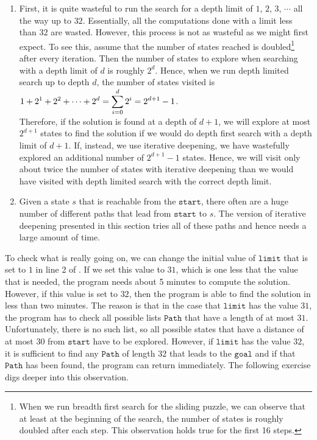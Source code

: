 \begin{enumerate}
\item First, it is quite wasteful to run the search for a depth limit of $1$, $2$, $3$, $\cdots$ all the way up
      to $32$.  Essentially, all the computations done with a limit less than $32$ are wasted. However,
      this process is not as wasteful as we might first expect.  To see this, assume that the number of states
      reached is doubled\footnote{
        When we run breadth first search for the sliding puzzle, we can observe that at least at the beginning
        of the search, the number of states is roughly doubled after each step.  This observation holds true for
        the first 16 steps. 
      }
      after every iteration.  Then the number of states to explore when searching with a depth limit of $d$ is 
      roughly $2^d$.  Hence, when we run depth limited search up to depth $d$, the number of states visited is 
      \\[0.2cm]
      \hspace*{1.3cm}
      $\displaystyle 1 + 2^1 + 2^2 + \cdots + 2^d = \sum\limits_{i=0}^d 2^i = 2^{d+1} - 1$.
      \\[0.2cm]
      Therefore, if the solution is found at a depth of $d+1$, we will explore at most $2^{d+1}$ states to find
      the solution if we would do depth first search with a depth limit of $d+1$.  If, instead, we use
      iterative deepening, we have wastefully explored an additional number of $2^{d+1} -1$ states.  Hence, we
      will visit only about twice the number of states with iterative deepening than we would have visited with depth
      limited search with the correct depth limit.
\item Given a state $s$ that is reachable from the $\texttt{start}$, there often are a huge number of
      different paths that lead from $\texttt{start}$ to $s$.  The version of iterative deepening presented in
      this section tries all of these paths and hence needs a large amount of time.
\end{enumerate}
To check what is really going on, we can change the initial value of $\texttt{limit}$ that is set to $1$ in
line 2 of .  If we set this value to $31$, which is one less that the
value that is needed, the program needs about 5 minutes to compute the solution.  However, if this value is set to
$32$, then the program is able to find the solution in less than two minutes.  The reason is that in the case that 
$\texttt{limit}$ has the value $31$, the program has to check all possible lists $\texttt{Path}$ that have a
length of at most $31$.  Unfortunately, there is no such list, so all possible states that have a distance of
at most $30$ from $\texttt{start}$ have to be explored. However, if $\texttt{limit}$ has the value $32$, it is sufficient to find any
$\texttt{Path}$ of length $32$ that leads to the $\texttt{goal}$ and if that $\texttt{Path}$ has been found, the
program can return immediately.  The following exercise digs deeper into this observation.

